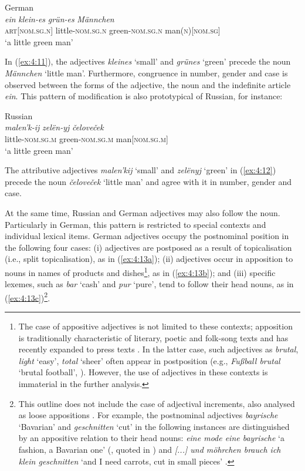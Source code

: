 \ea
\label{ex:4:11}
German \citep[1991]{ids-3-1997}\\
\textit{ein} \textit{klein-es} \textit{grün-es} \textit{Männchen}\\
	\textsc{art[nom.sg.n]} little-\textsc{nom.sg.n} green-\textsc{nom.sg.n} man(\textsc{n})[\textsc{nom.sg}]\\
\glt `a little green man'
\z

\noindent In (\ref{ex:4:11}), the adjectives \textit{kleines} `small' and \textit{grünes} `green' precede the noun \textit{Männchen} `little man'. Furthermore, congruence in number, gender and case is observed between the forms of the adjective, the noun and the indefinite article \textit{ein}. This pattern of modification is also prototypical of Russian, for instance: 

\ea
\label{ex:4:12}
Russian\\
\textit{malen'k-ij} \textit{zelën-yj} \textit{čeloveček}\\
	little-\textsc{nom.sg.m} green-\textsc{nom.sg.m} man[\textsc{nom.sg.m}]\\
\glt `a little green man'
\z

\noindent The attributive adjectives \textit{malen'kij} `small' and \textit{zelënyj} `green' in (\ref{ex:4:12}) precede the noun \textit{čeloveček} `little man' and agree with it in number, gender and case. 

At the same time, Russian and German adjectives may also follow the noun. Particularly in German, this pattern is restricted to special contexts and individual lexical items. German adjectives occupy the postnominal position in the following four cases: (i) adjectives are postposed as a result of topicalisation (i.e., split topicalisation), as in (\ref{ex:4:13a}); (ii) adjectives occur in apposition to nouns in names of products and dishes\footnote{The case of appositive adjectives is not limited to these contexts; apposition is traditionally characteristic of literary, poetic and folk-song texts \citep[cf.][1991]{ids-3-1997} and has recently expanded to press texts \citep{duerscheid-2002}. In the latter case, such adjectives as \textit{brutal}, \textit{light} `easy',  \textit{total} `sheer' often appear in postposition (e.g., \textit{Fußball brutal} `brutal football', \citealt[67]{duerscheid-2002}). However, the use of adjectives in these contexts is immaterial in the further analysis.}, as in (\ref{ex:4:13b}); and (iii) specific lexemes, such as \textit{bar} `cash' and \textit{pur} `pure', tend to follow their head nouns, as in (\ref{ex:4:13c})\footnote{This outline does not include the case of adjectival increments, also analysed as loose appositions \citep[654]{auer-increm}. For example, the postnominal adjectives \textit{bayrische} `Bavarian' and \textit{geschnitten} `cut' in the following instances are distinguished by an appositive relation to their head nouns: \textit{eine mode eine bayrische} `a fashion, a Bavarian one' (\citealt[103]{schroeder-1997}, quoted in \citealt[142]{schwitalla-2006}) and \textit{[...] und möhrchen brauch ich klein geschnitten} `and I need carrots, cut in small pieces' \citep[654]{auer-increm}.}.

